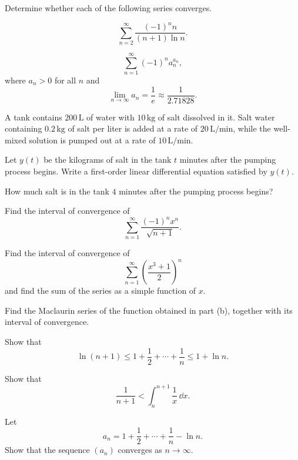\begin{problem}
Determine whether each of the following series converges.
\begin{problemsubparts}
\item
\[
\sum_{n=2}^{\infty}\frac{(-1)^n n}{(n+1)\ln n}.
\]
\item
\[
\sum_{n=1}^{\infty}(-1)^n a_n^{a_n},
\]
where $a_n>0$ for all $n$ and
\[
\lim_{n\to\infty}a_n=\frac1e\approx\frac1{2.71828}.
\]
\end{problemsubparts}
\end{problem}

\begin{problem}
A tank contains $200\,\mathrm{L}$ of water with $10\,\mathrm{kg}$ of salt dissolved in it. Salt water containing $0.2\,\mathrm{kg}$ of salt per liter is added at a rate of $20\,\mathrm{L/min}$, while the well-mixed solution is pumped out at a rate of $10\,\mathrm{L/min}$.
\begin{problemsubparts}
\item Let $y(t)$ be the kilograms of salt in the tank $t$ minutes after the pumping process begins. Write a first-order linear differential equation satisfied by $y(t)$.
\item How much salt is in the tank $4$ minutes after the pumping process begins?
\end{problemsubparts}
\end{problem}

\begin{problem}
\begin{problemsubparts}
\item Find the interval of convergence of
\[
\sum_{n=1}^{\infty}\frac{(-1)^n x^n}{\sqrt{n+1}}.
\]
\item Find the interval of convergence of
\[
\sum_{n=1}^{\infty}\left(\frac{x^3+1}{2}\right)^n
\]
and find the sum of the series as a simple function of $x$.
\item Find the Maclaurin series of the function obtained in part \textup{(b)}, together with its interval of convergence.
\end{problemsubparts}
\end{problem}

\begin{problem}
\begin{problemsubparts}
\item Show that
\[
\ln(n+1)
\le
1+\frac12+\cdots+\frac1n
\le
1+\ln n.
\]
\item Show that
\[
\frac1{n+1}<\int_n^{n+1}\frac1x\,\dd x.
\]
\item Let
\[
a_n=1+\frac12+\cdots+\frac1n-\ln n.
\]
Show that the sequence $(a_n)$ converges as $n\to\infty$.
\end{problemsubparts}
\end{problem}


